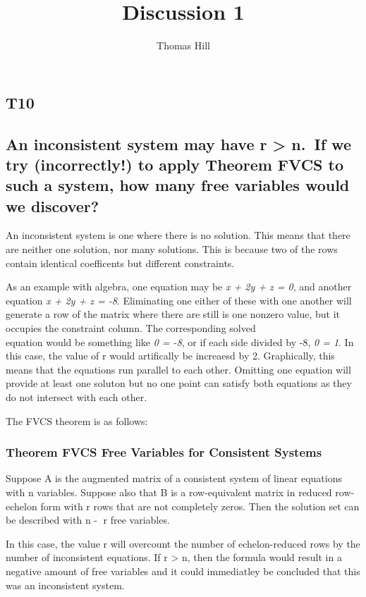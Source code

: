 \documentclass[
]{article}
\title{Discussion 1}
\author{Thomas Hill}
\date{}
\begin{document}
\maketitle

\hypertarget{t10}{%
\subsection{\texorpdfstring{\textbf{T10}}{T10}}\label{t10}}

\hypertarget{an-inconsistent-system-may-have-r-n.-if-we-try-incorrectly-to-apply-theorem-fvcs-to-such-a-system-how-many-free-variables-would-we-discover}{%
\subsection{An inconsistent system may have r \textgreater{} n.~If we
try (incorrectly!) to apply Theorem FVCS to such a system, how many free
variables would we
discover?}\label{an-inconsistent-system-may-have-r-n.-if-we-try-incorrectly-to-apply-theorem-fvcs-to-such-a-system-how-many-free-variables-would-we-discover}}

An inconsistent system is one where there is no solution. This means
that there are neither one solution, nor many solutions. This is because
two of the rows contain identical coefficents but different constraints.

As an example with algebra, one equation may be \emph{x + 2y + z = 0},
and another equation \emph{x + 2y + z = -8}. Eliminating one either of
these with one another will generate a row of the matrix where there are
still is one nonzero value, but it occupies the constraint column. The
corresponding solved\\
equation would be something like \emph{0 = -8}, or if each side divided
by -8, \emph{0 = 1}. In this case, the value of r would artifically be
increaesd by 2. Graphically, this means that the equations run parallel
to each other. Omitting one equation will provide at least one soluton
but no one point can satisfy both equations as they do not intersect
with each other.

The FVCS theorem is as follows:

\hypertarget{theorem-fvcs-free-variables-for-consistent-systems}{%
\subsubsection{Theorem FVCS Free Variables for Consistent
Systems}\label{theorem-fvcs-free-variables-for-consistent-systems}}

Suppose A is the augmented matrix of a consistent system of linear
equations with n variables. Suppose also that B is a row-equivalent
matrix in reduced row-echelon form with r rows that are not completely
zeros. Then the solution set can be described with n -􀀀 r free
variables.

In this case, the value r will overcount the number of echelon-reduced
rows by the number of inconsistent equations. If r \textgreater{} n,
then the formula would result in a negative amount of free variables and
it could immediatley be concluded that this was an inconsistent system.
\end{document}
